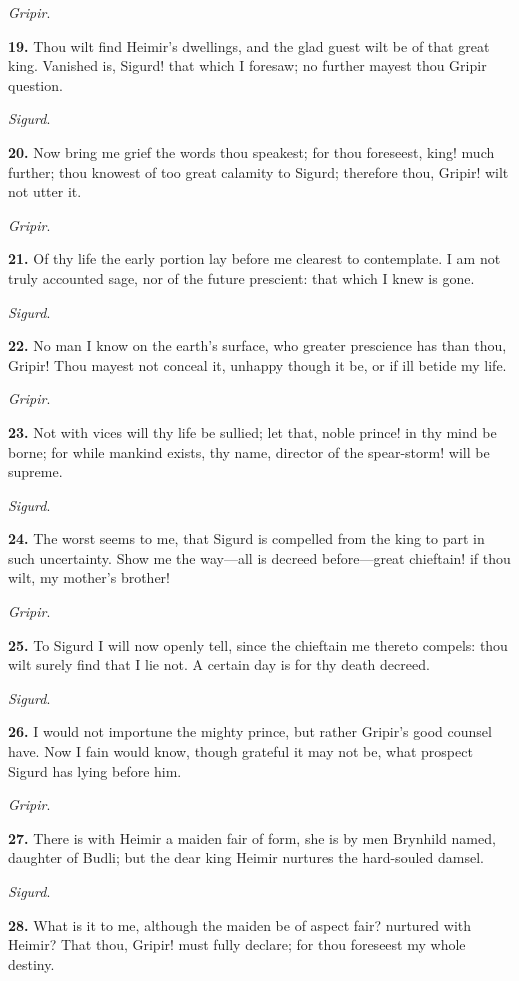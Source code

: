 \emph{Gripir}.

\textbf{19.} Thou wilt find Heimir's dwellings, and the glad guest wilt be of
that great king. Vanished is, Sigurd! that which I foresaw; no further
mayest thou Gripir question.

\emph{Sigurd}.

\textbf{20.} Now bring me grief the words thou speakest; for thou foreseest,
king! much further; thou knowest of too great calamity to Sigurd;
therefore thou, Gripir! wilt not utter it.

\emph{Gripir}.

\textbf{21.} Of thy life the early portion lay before me clearest to
contemplate. I am not truly accounted sage, nor of the future
prescient: that which I knew is gone.

\emph{Sigurd}.

\textbf{22.} No man I know on the earth's surface, who greater prescience has
than thou, Gripir! Thou mayest not conceal it, unhappy though it be,
or if ill betide my life.

\emph{Gripir}.

\textbf{23.} Not with vices will thy life be sullied; let that, noble
prince! in thy mind be borne; for while mankind exists, thy name,
director of the spear-storm! will be supreme.

\emph{Sigurd}.

\textbf{24.} The worst seems to me, that Sigurd is compelled from the king to
part in such uncertainty. Show me the way—all is decreed
before—great chieftain! if thou wilt, my mother's brother!

\emph{Gripir}.

\textbf{25.} To Sigurd I will now openly tell, since the chieftain me thereto
compels: thou wilt surely find that I lie not. A certain day is for
thy death decreed.

\emph{Sigurd}.

\textbf{26.} I would not importune the mighty prince, but rather Gripir's
good counsel have. Now I fain would know, though grateful it may not
be, what prospect Sigurd has lying before him.

\emph{Gripir}.

\textbf{27.} There is with Heimir a maiden fair of form, she is by men
Brynhild named, daughter of Budli; but the dear king Heimir nurtures
the hard-souled damsel.

\emph{Sigurd}.

\textbf{28.} What is it to me, although the maiden be of aspect fair?
nurtured with Heimir? That thou, Gripir! must fully declare; for thou
foreseest my whole destiny.

